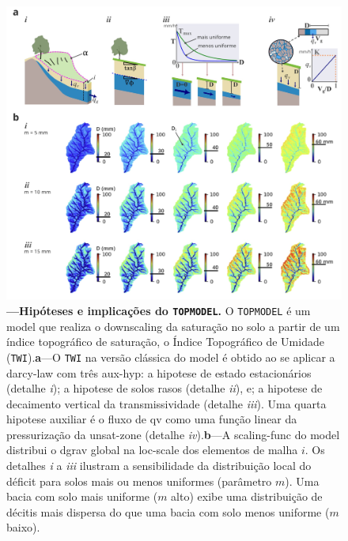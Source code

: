 \documentclass[./main.tex]{subfiles}
\begin{document}
\begin{figure}[t!] 
\centering				
\includegraphics[width=0.98\linewidth]{figs/fig_topmodel.jpg}		
\caption[Hipóteses e implicações do \texttt{TOPMODEL}]
{\textbf{---\;Hipóteses e implicações do \texttt{TOPMODEL}.}
    O \texttt{TOPMODEL} é um \gls{model} que realiza o \gls{downscaling} da saturação no solo a partir de um índice topográfico de saturação, o Índice Topográfico de Umidade (\texttt{TWI}).\;\textbf{a}\;---\;O \texttt{TWI} na versão clássica do \gls{model} é obtido ao se aplicar a \gls{darcy-law} com três \gls{aux-hyp}: a \gls{hipotese} de estado estacionários (detalhe \textrm{\textit{i}}); a \gls{hipotese} de solos rasos (detalhe \textrm{\textit{ii}}), e; a \gls{hipotese} de decaimento vertical da transmissividade (detalhe \textrm{\textit{iii}}). Uma quarta \gls{hipotese} auxiliar é o fluxo de \gls{qv} como uma função linear da pressurização da \gls{unsat-zone} (detalhe \textrm{\textit{iv}}).\;\textbf{b}\;---\;A \gls{scaling-func} do \gls{model} distribui o \gls{dgrav} global na \gls{loc-scale} dos elementos de malha $i$. Os detalhes \textrm{\textit{i}} a \textrm{\textit{iii}} ilustram a sensibilidade da distribuição local do déficit para solos mais ou menos uniformes (parâmetro $m$). Uma bacia com solo mais uniforme ($m$ alto) exibe uma distribuição de décitis mais dispersa do que uma bacia com solo menos uniforme ($m$ baixo). 
}
\label{fig:hydro:topmodel} 		
\end{figure}
\end{document}
